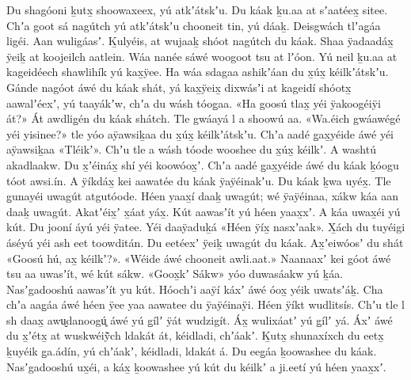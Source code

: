 \clearpage
\begin{pairs}
\begin{Leftside}
\beginnumbering
\pstart
\noindent
{}Du shagóoni ḵutx̱ shoowaxeex, yú atkʼátskʼu.
Du káak ḵu.aa at sʼaatéex̱ sitee.
Chʼa goot sá nagútch yú atkʼátskʼu chooneit tin, yú dáaḵ.
Deisgwách tlʼag̱áa ligéi.
Aan wuligáasʼ.
Ḵul\-yéis, at wujaaḵ shóot nagútch du káak.
Shaa ÿadaadáx̱ ÿeiḵ at koojeilch aatlein.
\pend
\pstart
{}Wáa nanée sáwé woogoot tsu at lʼóon.
Yú neil ḵu.aa at kageidéech shawlihík yú kax̱ÿee.
Ha wáa sdagaa ashikʼáan du x̱úx̱ kéilkʼátskʼu.
Gánde nagóot áwé du káak shát, yá kax̱ÿeix̱ dixwásʼi at kageidí shóotx̱ aawalʼéexʼ, yú taayákʼw, chʼa du wásh tóog̱aa.
«\!Ha goosú tlax̱ yéi ÿakoo\-géiÿi át?\!»
Át awdlig̱én du káak shátch.
Tle gwáayá l a shoowú aa.
«\!Wa.éich gwáawégé yéi yisinee?\!»
tle yóo aÿawsiḵaa du x̱úx̱ kéil\-kʼátskʼu.
Chʼa aadé g̱ax̱yéide áwé yéi aÿawsiḵaa «\!Tléikʼ\!».
Chʼu tle a wásh tóode wooshee du x̱úx̱ kéilkʼ.
A washtú akadlaakw.
Du x̱ʼéináx̱ shí yéi koowóox̱ʼ.
Chʼa aadé g̱ax̱yéide áwé du káak ḵóogu tóot awsi.ín.
A ÿíkdáx̱ kei aawatée du káak ÿaÿéinakʼu.
Du káak ḵwa uyéx̱.
\pend
\pstart
{}Tle g̱unayéi uwagút atgutóode.
Héen yaax̱í daaḵ uwagút;
wé ÿaÿéinaa, xákw káa aan daaḵ uwagút.
Akatʼéix̱ʼ x̱áat yáx̱.
Kút aawasʼít yú héen yaax̱xʼ.
A káa uwax̱éi yú kút.
Du jooní áyú yéi ÿatee.
Yéi daaÿaduḵá «\!Héen ÿíx̱ nasxʼaak\!».
X̱ách du tuyéigi áséyú yéi ash eet toowditán.
\pend
\pstart
{}Du eetéexʼ ÿeiḵ uwagút du káak.
Ax̱ʼeiwóosʼ du shát «\!Goosú hú, ax̱ kéilkʼ?\!».
«\!Wéi\-de áwé chooneit awli.aat.\!»
\pend
\pstart
{}Naanaaxʼ kei góot áwé tsu aa uwasʼít, wé kút sákw.
«\!Goox̱kʼ Sákw\!» yóo duwasáakw yú ḵáa.
Nasʼgadooshú aawasʼít yu kút.\linebreak
{}Hóochʼi aaÿí káxʼ áwé óox̱ yéik uwatsʼáḵ.
Cha chʼa aag̱áa áwé héen ÿee yaa aawatee du ÿaÿéinaÿi.
Héen ÿíkt wudlitsís.
Chʼu tle l sh daax̱ awu̬danoogú̥ áwé yú g̱ílʼ ÿát wudzigít.
Áx̱ wulixáatʼ yú g̱ílʼ yá.
Áxʼ áwé du x̱ʼétx̱ at wuskwéiÿ̃ch ldakát át, kéi\-dladi, chʼáakʼ.
Ḵutx̱ shunaxíxch du eetx̱ ḵuyéik g̱a.ádín, yú chʼáakʼ, kéidladi, ldakát á.
\pend
\pstart
{}Du eeg̱áa ḵoowashee du káak.
Nasʼga\-dooshú ux̱éi, a káx̱ ḵoowashee yú kút du kéilkʼ a ji.eetí yú héen yaax̱xʼ.

\end{Leftside}
\end{pairs}
